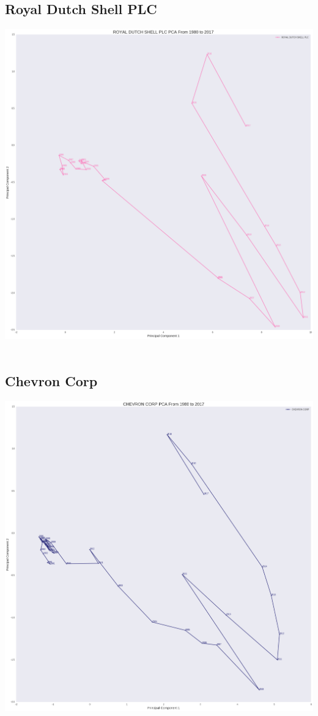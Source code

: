 \subsection{Royal Dutch Shell PLC}
\includegraphics[width=1\textwidth]{./Shell}\\[0.1in] \\
\subsection{Chevron Corp}
\includegraphics[width=1\textwidth]{./Chevron}\\[0.1in] \\

